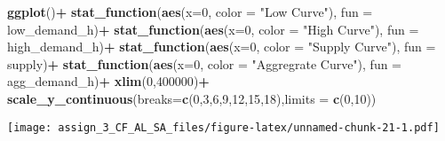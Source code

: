 \documentclass[]{article}
\newenvironment{Shaded}{\begin{snugshade}}{\end{snugshade}}
\newcommand{\DataTypeTok}[1]{\textcolor[rgb]{0.13,0.29,0.53}{#1}}
\newcommand{\DecValTok}[1]{\textcolor[rgb]{0.00,0.00,0.81}{#1}}
\newcommand{\KeywordTok}[1]{\textcolor[rgb]{0.13,0.29,0.53}{\textbf{#1}}}
\newcommand{\NormalTok}[1]{#1}
\newcommand{\OperatorTok}[1]{\textcolor[rgb]{0.81,0.36,0.00}{\textbf{#1}}}
\newcommand{\StringTok}[1]{\textcolor[rgb]{0.31,0.60,0.02}{#1}}
\begin{document}
\begin{Shaded}
\begin{Highlighting}[]
\KeywordTok{ggplot}\NormalTok{()}\OperatorTok{+}
\StringTok{  }\KeywordTok{stat_function}\NormalTok{(}\KeywordTok{aes}\NormalTok{(}\DataTypeTok{x=}\DecValTok{0}\NormalTok{, }\DataTypeTok{color =} \StringTok{"Low Curve"}\NormalTok{), }\DataTypeTok{fun =}\NormalTok{ low_demand_h)}\OperatorTok{+}
\StringTok{  }\KeywordTok{stat_function}\NormalTok{(}\KeywordTok{aes}\NormalTok{(}\DataTypeTok{x=}\DecValTok{0}\NormalTok{, }\DataTypeTok{color =} \StringTok{"High Curve"}\NormalTok{), }\DataTypeTok{fun =}\NormalTok{ high_demand_h)}\OperatorTok{+}
\StringTok{  }\KeywordTok{stat_function}\NormalTok{(}\KeywordTok{aes}\NormalTok{(}\DataTypeTok{x=}\DecValTok{0}\NormalTok{, }\DataTypeTok{color =} \StringTok{"Supply Curve"}\NormalTok{), }\DataTypeTok{fun =}\NormalTok{ supply)}\OperatorTok{+}\StringTok{ }\KeywordTok{stat_function}\NormalTok{(}\KeywordTok{aes}\NormalTok{(}\DataTypeTok{x=}\DecValTok{0}\NormalTok{, }\DataTypeTok{color =} \StringTok{"Aggregrate Curve"}\NormalTok{), }\DataTypeTok{fun =}\NormalTok{ agg_demand_h)}\OperatorTok{+}\StringTok{ }
\KeywordTok{xlim}\NormalTok{(}\DecValTok{0}\NormalTok{,}\DecValTok{400000}\NormalTok{)}\OperatorTok{+}\StringTok{ }
\StringTok{  }\KeywordTok{scale_y_continuous}\NormalTok{(}\DataTypeTok{breaks=}\KeywordTok{c}\NormalTok{(}\DecValTok{0}\NormalTok{,}\DecValTok{3}\NormalTok{,}\DecValTok{6}\NormalTok{,}\DecValTok{9}\NormalTok{,}\DecValTok{12}\NormalTok{,}\DecValTok{15}\NormalTok{,}\DecValTok{18}\NormalTok{),}\DataTypeTok{limits =} \KeywordTok{c}\NormalTok{(}\DecValTok{0}\NormalTok{,}\DecValTok{10}\NormalTok{))}
\end{Highlighting}
\end{Shaded}

\texttt{[image: assign\_3\_CF\_AL\_SA\_files/figure-latex/unnamed-chunk-21-1.pdf]}
\end{document}
